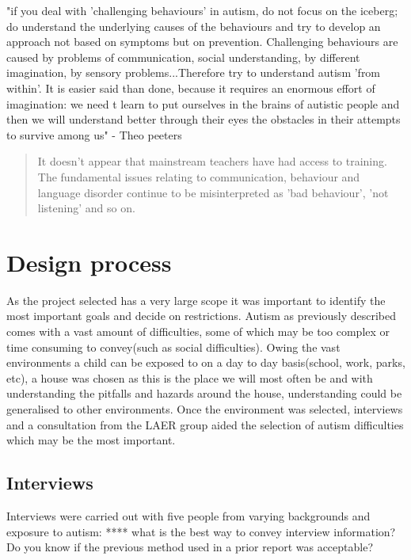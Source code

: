 \documentclass[11pt]{report}
\begin{document}
"if you deal with 'challenging behaviours' in autism, do not focus on the iceberg; do understand the underlying causes of the behaviours and try to develop an approach not based on symptoms but on prevention. Challenging behaviours are caused by problems of communication, social understanding, by different imagination, by sensory problems...Therefore try to understand autism 'from within'. It is easier said than done, because it requires an enormous effort of imagination: we need t learn to put ourselves in the brains of autistic people and then we will understand better through their eyes the obstacles in their attempts to survive among us" - Theo peeters \cite{olgab}

\begin{quote}
It doesn't appear that mainstream teachers have had access to training. The fundamental issues relating to communication, behaviour and language disorder continue to be misinterpreted as 'bad behaviour', 'not listening' and so on.\cite{nasschool}
\end{quote}

\chapter{Design process}
As the project selected has a very large scope it was important to identify the most important goals and decide on restrictions. Autism as previously described comes with a vast amount of difficulties, some of which may be too complex or time consuming to convey(such as social difficulties). Owing the vast environments a child can be exposed to on a day to day basis(school, work, parks, etc), a house was chosen as this is the place we will most often be and with understanding the pitfalls and hazards around the house, understanding could be generalised to other environments. Once the environment was selected, interviews and a consultation from the LAER group aided the selection of autism difficulties which may be the most important.

\section{Interviews}

Interviews were carried out with five people from varying backgrounds and exposure to autism:
**** what is the best way to convey interview information? Do you know if the previous method used in a prior report was acceptable?
\end{document}
